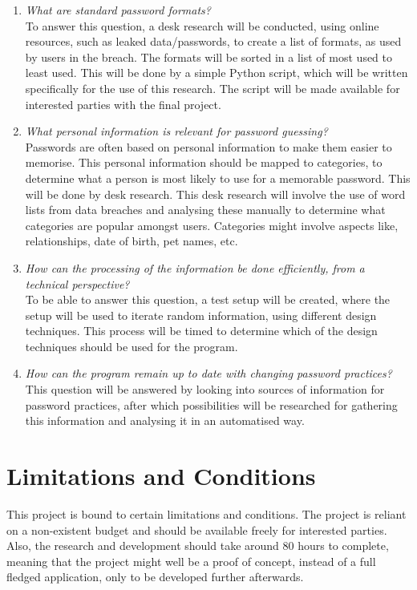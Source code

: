 \documentclass[a4paper,12pt]{article}
\begin{document}
\begin{enumerate}
\item \textit{What are standard password formats?}\\
  To answer this question, a desk research will be conducted, using online resources, such as leaked data/passwords, to create a list of formats, as used by users in the breach. The formats will be sorted in a list of most used to least used. This will be done by a simple Python script, which will be written specifically for the use of this research. The script will be made available for interested parties with the final project.
  
\item \textit{What personal information is relevant for password guessing?}\\
  Passwords are often based on personal information to make them easier to memorise. This personal information should be mapped to categories, to determine what a person is most likely to use for a memorable password. This will be done by desk research. This desk research will involve the use of word lists from data breaches and analysing these manually to determine what categories are popular amongst users. Categories might involve aspects like, relationships, date of birth, pet names, etc.
  
\item \textit{How can the processing of the information be done efficiently, from a technical perspective?}\\
  To be able to answer this question, a test setup will be created, where the setup will be used to iterate random information, using different design techniques. This process will be timed to determine which of the design techniques should be used for the program.

\item \textit{How can the program remain up to date with changing password practices?}
  This question will be answered by looking into sources of information for password practices, after which possibilities will be researched for gathering this information and analysing it in an automatised way.
  
\end{enumerate}

\newpage
\section{Limitations and Conditions}
This project is bound to certain limitations and conditions. The project is reliant on a non-existent budget and should be available freely for interested parties. Also, the research and development should take around 80 hours to complete, meaning that the project might well be a proof of concept, instead of a full fledged application, only to be developed further afterwards.\\
\end{document}
